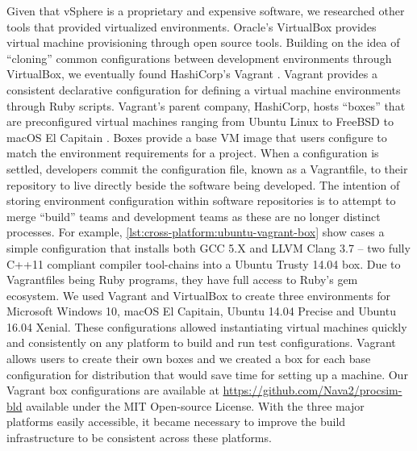 Given that vSphere is a proprietary and expensive software, we researched other tools that provided virtualized environments. Oracle's VirtualBox \cite{Oracle:VirtualBox} provides virtual machine provisioning through open source tools. Building on the idea of ``cloning'' common configurations between development environments through VirtualBox, we eventually found HashiCorp's Vagrant \cite{VagrantUp}. Vagrant provides a consistent declarative configuration for defining a virtual machine environments through Ruby scripts. Vagrant's parent company, HashiCorp, hosts ``boxes'' that are preconfigured virtual machines ranging from Ubuntu Linux to FreeBSD to macOS El Capitain \cite{Vagrant:Boxes}. Boxes provide a base VM image that users configure to match the environment requirements for a project. When a configuration is settled, developers commit the configuration file, known as a Vagrantfile, to their repository to live directly beside the software being developed. The intention of storing environment configuration within software repositories is to attempt to merge ``build'' teams and development teams as these are no longer distinct processes. For example, \cref{lst:cross-platform:ubuntu-vagrant-box} show cases a simple configuration that installs both GCC 5.X and LLVM Clang \cite{LLVM:Clang} 3.7 -- two fully C++11 compliant compiler tool-chains into a Ubuntu Trusty 14.04 box. Due to Vagrantfiles being Ruby programs, they have full access to Ruby's gem ecosystem. We used Vagrant and VirtualBox to create three environments for Microsoft Windows 10, macOS El Capitain, Ubuntu 14.04 Precise and Ubuntu 16.04 Xenial. These configurations allowed instantiating virtual machines quickly and consistently on any platform to build and run test configurations. Vagrant allows users to create their own boxes and we created a box for each base configuration for distribution that would save time for setting up a machine. Our Vagrant box configurations are available at \url{https://github.com/Nava2/procsim-bld} available under the MIT Open-source License. With the three major platforms easily accessible, it became necessary to improve the build infrastructure to be consistent across these platforms.

